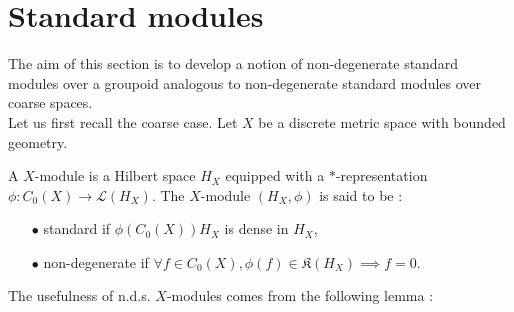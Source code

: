 

\section{Standard modules}

The aim of this section is to develop a notion of non-degenerate standard modules over a groupoid analogous to non-degenerate standard modules over coarse spaces. \\

Let us first recall the coarse case. Let $X$ be a discrete metric space with bounded geometry. 

\begin{definition}
A $X$-module is a Hilbert space $H_X$ equipped with a $*$-representation $\phi : C_0(X) \rightarrow \mathcal L(H_X)$. The $X$-module $(H_X,\phi)$ is said to be :\\

\begin{itemize}
\item[$\bullet$] standard if $\phi(C_0(X))H_X$ is dense in $H_X$,
\item[$\bullet$] non-degenerate if $\forall f \in C_0(X), \phi(f)\in \mathfrak K (H_X) \implies f=0$.
\end{itemize}
\end{definition}

The usefulness of n.d.s. $X$-modules comes from the following lemma :

